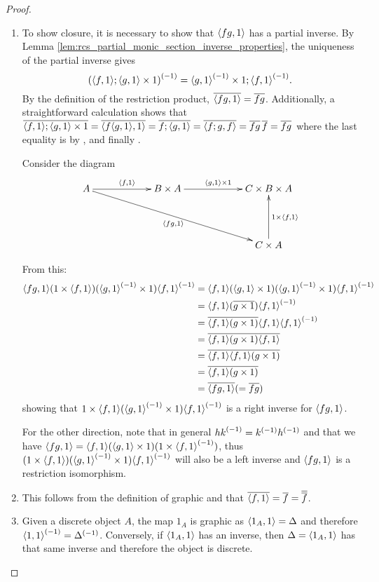 \begin{proof}
  \prepprooflist
  \begin{enumerate}[{(}i{)}]
    \item To show closure, it is necessary to show that $\langle f g,1\rangle$ has a partial inverse.
      By Lemma \vref{lem:rcs_partial_monic_section_inverse_properties}, the uniqueness of the 
      partial inverse gives
      \[
        {(\langle f,1\rangle ; \langle g,1\rangle\times 1)}^{(-1)} = {\langle g,1\rangle}^{(-1)} \times 1 ; {\langle f,1\rangle}^{(-1)} .
      \]
      By the definition of the restriction product, $\overline{\langle f g,1\rangle} = \overline{f g}$. Additionally,
      a straightforward calculation shows that 
        $\overline{\langle f,1\rangle;\langle g,1\rangle \times 1} = 
          \overline{\langle f\langle g,1\rangle, 1\rangle} = \overline{f ;\langle g,1\rangle}
          = \overline{\langle f;g, f\rangle} = \overline{f g}\,\overline{f} = \overline{f g}
        $ 
      where the last equality is by \rtwo, \rthree and finally \rone.

    Consider the diagram
    \[
      \xymatrix @C+35pt @R+20pt{
        A \ar[r]^{\<f,1\>} \ar[drr]_{\<f g,1\>} &
           B \times A  \ar[r]^{\<g,1\> \times 1}
           &  C \times B \times A \\
        &&C \times A \ar[u]_{1 \times \<f,1\>}
      }
    \]

    From this:
    \begin{align*}
      \langle f g,1\rangle  (1\times \langle f,1\rangle) ( {\langle g,1\rangle}^{(-1)}\times 1) {\langle f,1\rangle}^{(-1)}
      &=\langle f,1\rangle(\langle g,1\rangle\times 1 ) ({\langle g,1\rangle}^{(-1)}\times 1) {\langle f,1\rangle}^{(-1)}\\
      &=\langle f,1\rangle (\overline{g\times 1}) {\langle f,1\rangle}^{(-1)}\\
      &=\overline{\langle f,1\rangle (g\times 1)}  \langle f,1\rangle {\langle f,1\rangle}^{(-1)}\\
      &=\overline{\langle f,1\rangle (g\times 1)}  \overline{\langle f,1\rangle}\\
      &= \overline{\langle f,1\rangle} \overline{\langle f,1\rangle(g\times 1)}\\
      &= \overline{\langle f,1\rangle (g\times 1)}\\
      &= \overline{\langle f g,1\rangle}(=\overline{f g})\\
    \end{align*}
    showing that $1\times \langle f,1\rangle  ({\langle g,1\rangle}^{(-1)}\times 1 ) {\langle f,1\rangle}^{(-1)}$ is
    a right inverse for $\langle f g,1\rangle$.

    For the other direction, note that in general ${h k}^{(-1)} = {k}^{(-1)}{h}^{(-1)}$ and that
    we have $\langle f g,1\rangle = \langle f,1\rangle (\langle g,1\rangle\times 1)  (1 \times {\langle f,1\rangle}^{(-1)})$, thus
    $(1\times \langle f,1\rangle)  ({\langle g,1\rangle}^{(-1)}\times 1) {\langle f,1\rangle}^{(-1)}$ will also be a left inverse and
    $\langle f g,1\rangle$ is a restriction isomorphism.

    \item This follows from the definition of graphic and that
       $\overline{\langle f,1\rangle} = \overline{f} = \overline{\overline{f}}$.

    \item Given a discrete object $A$, the map $1_A$ is graphic as $\langle1_A,1\rangle = \Delta$ 
      and therefore ${\langle1,1\rangle}^{(-1)} = {\Delta}^{(-1)}$. Conversely, if $\langle1_A,1\rangle$ has an inverse, 
      then $\Delta = \langle1_A,1\rangle$ has that same inverse and therefore the object is discrete.
  \end{enumerate}
\end{proof}

